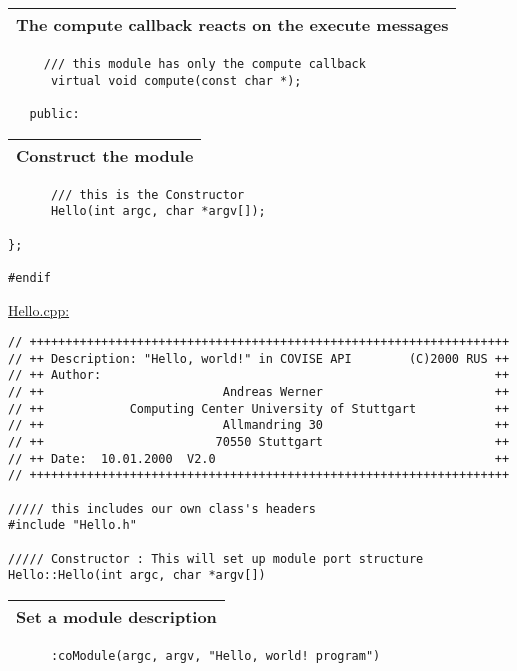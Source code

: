 \begin{longtable}{|l|}
\hline
   {\bf The compute callback reacts on the execute messages} \\
\hline
\end{longtable}

\begin{verbatim}   
     /// this module has only the compute callback
      virtual void compute(const char *);
   
   public:
\end{verbatim}    

\begin{longtable}{|l|}
\hline
   {\bf Construct the module} \\
\hline
\end{longtable}

\begin{verbatim}
      /// this is the Constructor
      Hello(int argc, char *argv[]);

};

#endif
\end{verbatim}

\underline{Hello.cpp:}

\begin{verbatim}
// +++++++++++++++++++++++++++++++++++++++++++++++++++++++++++++++++++
// ++ Description: "Hello, world!" in COVISE API        (C)2000 RUS ++
// ++ Author:                                                       ++
// ++                         Andreas Werner                        ++
// ++            Computing Center University of Stuttgart           ++
// ++                         Allmandring 30                        ++
// ++                        70550 Stuttgart                        ++
// ++ Date:  10.01.2000  V2.0                                       ++
// +++++++++++++++++++++++++++++++++++++++++++++++++++++++++++++++++++
 
///// this includes our own class's headers
#include "Hello.h"

///// Constructor : This will set up module port structure
Hello::Hello(int argc, char *argv[])
\end{verbatim}

\begin{longtable}{|l|}
\hline
   {\bf Set a module description} \\
\hline
\end{longtable}

\begin{verbatim}
      :coModule(argc, argv, "Hello, world! program")
\end{verbatim}

